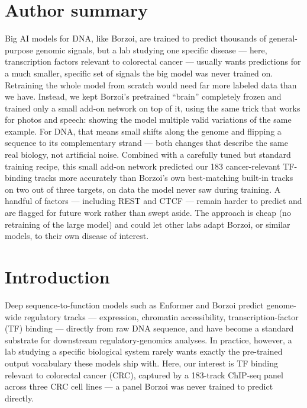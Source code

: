 \documentclass[10pt]{article}
\begin{document}
\section*{Author summary}
Big AI models for DNA, like Borzoi, are trained to predict thousands of general-purpose genomic signals, but a lab studying one specific disease --- here, transcription factors relevant to colorectal cancer --- usually wants predictions for a much smaller, specific set of signals the big model was never trained on. Retraining the whole model from scratch would need far more labeled data than we have. Instead, we kept Borzoi's pretrained ``brain'' completely frozen and trained only a small add-on network on top of it, using the same trick that works for photos and speech: showing the model multiple valid variations of the same example. For DNA, that means small shifts along the genome and flipping a sequence to its complementary strand --- both changes that describe the same real biology, not artificial noise. Combined with a carefully tuned but standard training recipe, this small add-on network predicted our 183 cancer-relevant TF-binding tracks more accurately than Borzoi's own best-matching built-in tracks on two out of three targets, on data the model never saw during training. A handful of factors --- including REST and CTCF --- remain harder to predict and are flagged for future work rather than swept aside. The approach is cheap (no retraining of the large model) and could let other labs adapt Borzoi, or similar models, to their own disease of interest.

\section*{Introduction}
Deep sequence-to-function models such as Enformer \citep{avsec2021} and Borzoi predict genome-wide regulatory tracks --- expression, chromatin accessibility, transcription-factor (TF) binding --- directly from raw DNA sequence, and have become a standard substrate for downstream regulatory-genomics analyses. In practice, however, a lab studying a specific biological system rarely wants exactly the pre-trained output vocabulary these models ship with. Here, our interest is TF binding relevant to colorectal cancer (CRC), captured by a 183-track ChIP-seq panel across three CRC cell lines --- a panel Borzoi was never trained to predict directly.
\end{document}
